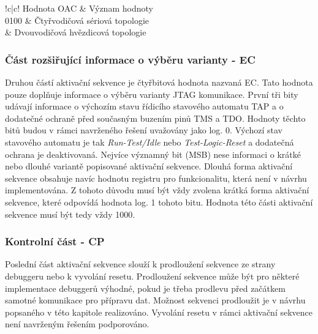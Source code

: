 \begin{table}[!h]
  \caption{Tabulka významu OAC hodnot. \cite{IEEE_1149-7}}
  \begin{center}
  	\small
	  \begin{tabular}{!{\vrule width 1.2pt}c|c!{\vrule width 1.2pt}}
	    Hodnota \acs{OAC} & Význam hodnoty\\
			0100 & Čtyřvodičová sériová topologie\\
			 & Dvouvodičová hvězdicová topologie\\
			\hline
		\end{tabular}
  \end{center}
	\label{tab:oac}
\end{table}

\subsubsection{Část rozšiřující informace o výběru varianty - \acs{EC}}
Druhou částí aktivační sekvence je čtyřbitová hodnota nazvaná \acl{EC}. Tato hodnota pouze doplňuje informace o výběru varianty \acs{JTAG} komunikace. První tři bity udávají informace o výchozím stavu řídicího stavového automatu \acs{TAP} a o dodatečné ochraně před současným buzením pinů \acs{TMS} a \acs{TDO}. Hodnoty těchto bitů budou v rámci navrženého řešení uvažovány jako log. 0. Výchozí stav stavového automatu je tak \textit{Run-Test/Idle} nebo \textit{Test-Logic-Reset} a dodatečná ochrana je deaktivovaná. Nejvíce významný bit (\acs{MSB}) nese informaci o krátké nebo dlouhé variantě popisované aktivační sekvence. Dlouhá forma aktivační sekvence obsahuje navíc hodnotu registru pro funkcionalitu, která není v návrhu implementována. Z tohoto důvodu musí být vždy zvolena krátká forma aktivační sekvence, které odpovídá hodnota log. 1 tohoto bitu. Hodnota této části aktivační sekvence musí být tedy vždy 1000. \cite{IEEE_1149-7}

\subsubsection{Kontrolní část - \acs{CP}}
Poslední část aktivační sekvence slouží k prodloužení sekvence ze strany debuggeru nebo k vyvolání resetu. Prodloužení sekvence může být pro některé implementace debuggerů výhodné, pokud je třeba prodlevu před začátkem samotné komunikace pro přípravu dat. Možnost sekvenci prodloužit je v návrhu popsaného v této kapitole realizováno. Vyvolání resetu v rámci aktivační sekvence není navrženým řešením podporováno. \cite{IEEE_1149-7}

